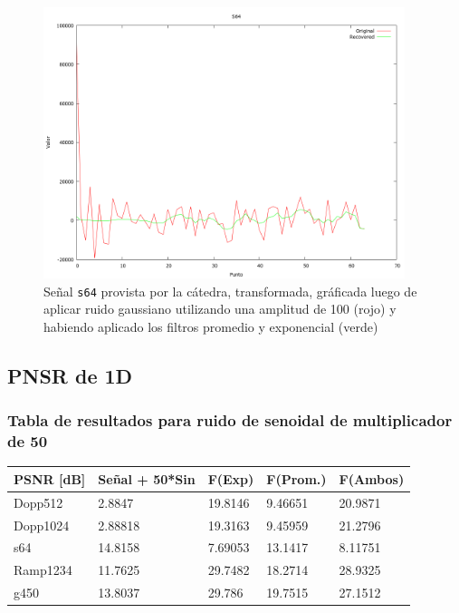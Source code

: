 \begin{figure}[H]
\begin {center}
\includegraphics[width=299pt]{imagenes/s64-gauss100-both-spec.png}
\end {center}
\caption{Se\~nal \texttt{s64} provista por la c\'atedra, transformada, gr\'aficada
luego de aplicar ruido gaussiano utilizando una amplitud de 100 (rojo) y 
habiendo aplicado los filtros promedio y exponencial (verde)}
\label{fig:scomb}
\end{figure}

\subsection{PNSR de 1D}
\subsubsection{Tabla de resultados para ruido de senoidal de multiplicador de 50}

\begin{table}[H]
        \begin{tabular}{|l|llll|}
                \hline
                \textbf{PSNR [dB]} & Se\~nal + 50*Sin & F(Exp) & F(Prom.) & F(Ambos) \\ \hline
                    Dopp512 & 2.8847 & 19.8146 & 9.46651 & 20.9871 \\
                    Dopp1024 & 2.88818 & 19.3163 & 9.45959 & 21.2796 \\
                    s64 & 14.8158 & 7.69053 & 13.1417 & 8.11751 \\
                    Ramp1234 & 11.7625 & 29.7482 & 18.2714 & 28.9325 \\
                    g450 & 13.8037 & 29.786 & 19.7515 & 27.1512 \\ \hline
                    \end{tabular}
                \end{table}

